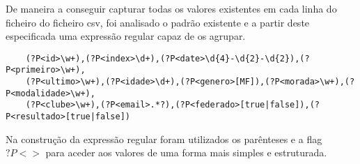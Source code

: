 De maneira a conseguir capturar todas os valores existentes em cada linha do ficheiro
do ficheiro csv, foi analisado o padrão existente e a partir deste especificada uma expressão regular 
capaz de os agrupar.

\begin{verbatim}
    (?P<id>\w+),(?P<index>\d+),(?P<date>\d{4}-\d{2}-\d{2}),(?P<primeiro>\w+),
    (?P<ultimo>\w+),(?P<idade>\d+),(?P<genero>[MF]),(?P<morada>\w+),(?P<modalidade>\w+),
    (?P<clube>\w+),(?P<email>.*?),(?P<federado>[true|false]),(?P<resultado>[true|false])
\end{verbatim}

Na construção da expressão regular foram utilizados os parênteses e a flag $?P<>$
para aceder aos valores de uma forma mais simples e estruturada.